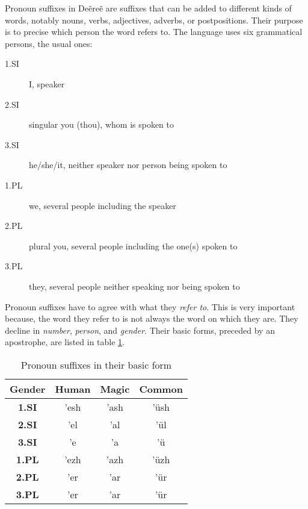 Pronoun suffixes in Deẽreẽ are suffixes that can be added to different kinds of words, notably nouns,
verbs, adjectives, adverbs, or postpositions. Their purpose is to precise which person the word
refers to. The language uses six grammatical persons, the usual ones:

\begin{description}
\item[1.SI] I, speaker
\item[2.SI] singular you (thou), whom is spoken to
\item[3.SI] he/she/it, neither speaker nor person being spoken to
\item[1.PL] we, several people including the speaker
\item[2.PL] plural you, several people including the one(s) spoken to
\item[3.PL] they, several people neither speaking nor being spoken to
\end{description}

Pronoun suffixes have to agree with what they \emph{refer to}. This is very important because, the
word they refer to is not always the word on which they are. They decline in \emph{number},
\emph{person}, and \emph{gender}. Their basic forms, preceded by an apostrophe, are listed in table
\ref{tab:morph-basic-pers-suff}.

\begin{table}[h]
\begin{center}
\begin{tabular}{|c||c|c|c|}
\hline
\textbf{Gender} & \textbf{Human} & \textbf{Magic} & \textbf{Common}\\\hline
\textbf{1.SI}                    & ’esh & ’ash & ’üsh \\\hline
\textbf{2.SI}                    & ’el  & ’al  & ’ül  \\\hline
\textbf{3.SI}                    & ’e   & ’a   & ’ü   \\\hline
\textbf{1.PL}                    & ’ezh & ’azh & ’üzh \\\hline
\textbf{2.PL}                    & ’er  & ’ar  & ’ür  \\\hline
\textbf{3.PL}                    & ’er  & ’ar  & ’ür  \\\hline
\end{tabular}
\end{center}
\caption{Pronoun suffixes in their basic form}
\label{tab:morph-basic-pers-suff}
\end{table}

